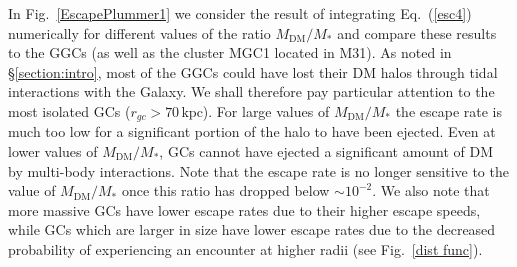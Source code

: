 \documentclass[aps,floatfix,prd,showpacs]{revtex4}
\newcommand{\MDM}{M_{\mathrm{DM}}}
\newcommand{\kpc}{\textrm{kpc}}
\begin{document}
In Fig.~\ref{EscapePlummer1} we consider the result of integrating Eq.~(\ref{esc4}) numerically for different values of the ratio $\MDM/M_*$ and compare these results to the GGCs (as well as the cluster MGC1 located in M31).  As noted in \S\ref{section:intro}, most of the GGCs could have lost their DM halos through tidal interactions with the Galaxy.  We shall therefore pay particular attention to the most isolated GCs ($r_{gc} > 70\, \kpc$). For large values of $\MDM/M_*$ the escape rate is much too low for a significant portion of the halo to have been ejected.  %
Even at lower values of $\MDM/M_*$, GCs cannot have ejected a significant amount of DM by multi-body interactions.  Note that the escape rate is no longer sensitive to the value of $\MDM/M_*$ once this ratio has dropped below $\sim 10^{-2}$.  We also note that more massive GCs have lower escape rates due to their higher escape speeds, while GCs which are larger in size have lower escape rates due to the decreased probability of experiencing an encounter at higher radii (see Fig.~\ref{dist func}).
%
\end{document}
